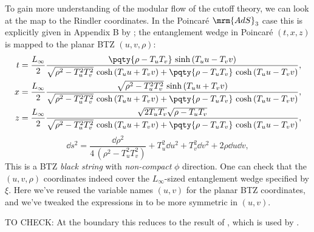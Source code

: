\documentclass[a4paper
	,10pt
]{article}
\begin{document}
	
	
	To gain more understanding of the modular flow of the cutoff theory, we can look at the map to the Rindler coordinates. In the Poincar\'e $\mrm{AdS}_3$ case this is explicitly given in Appendix B by \textcite{Song:2016gtd}; the entanglement wedge in Poincar\'e $(t,x,z)$ is mapped to the planar BTZ $(u,v,\rho)$:
	\begin{equation}
	\begin{aligned}
		t &= \frac{L_\infty}{2} \frac{
				\pqty{\rho - T_u T_v}
				\,\sinh\,(T_u u - T_v v)
			}{
				\sqrt{\rho^2 - T_u^2 T_v^2}
					\,\cosh\,(T_u u + T_v v)
				+ \pqty{\rho - T_u T_v}
					\,\cosh\,(T_u u - T_v v)
			},
	\\
		x &= \frac{L_\infty}{2} \frac{
				\sqrt{\rho^2 - T_u^2 T_v^2}
				\,\sinh\,(T_u u + T_v v)
			}{
				\sqrt{\rho^2 - T_u^2 T_v^2}
					\,\cosh\,(T_u u + T_v v)
				+ \pqty{\rho - T_u T_v}
					\,\cosh\,(T_u u - T_v v)
			},
	\\
		z &= \frac{L_\infty}{2} \frac{
				\sqrt{2T_u T_v}
				\sqrt{\rho - T_u T_v}
			}{
				\sqrt{\rho^2 - T_u^2 T_v^2}
					\,\cosh\,(T_u u + T_v v)
				+ \pqty{\rho - T_u T_v}
					\,\cosh\,(T_u u - T_v v)
			},
	\end{aligned}
	\label{eq:poincare2btz}
	\end{equation}
	\begin{equation}
		\dd{s}^2
		= \frac{\dd{\rho}^2}{4\,(\rho^2 - T_u^2 T_v^2)}
			+ T_u^2 \dd{u}^2
			+ T_v^2 \dd{v}^2
			+ 2\rho \dd{u} \dd{v},
	\end{equation}
	This is a BTZ \textit{black string} with \textit{non-compact} $\phi$ direction. 
	One can check that the $(u,v,\rho)$ coordinates indeed cover the $L_\infty$-sized entanglement wedge specified by $\xi$. 
	Here we've reused the variable names $(u,v)$ for the planar BTZ coordinates, and we've tweaked the expressions in \cite{Song:2016gtd} to be more symmetric in $(u,v)$. 
	
	TO CHECK: At the boundary this reduces to the result of \textcite{Casini:2011kv}, which is used by \textcite{Lewkowycz:2019xse}.
	
\end{document}
